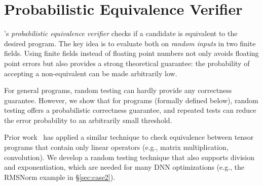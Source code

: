 \section{Probabilistic Equivalence Verifier}
\label{sec:verify}


\sys's {\em probabilistic equivalence verifier} checks if a candidate \graph is equivalent to the desired \lax program.
The key idea is to evaluate both on {\em random inputs} in two finite fields.
Using finite fields instead of floating point numbers not only avoids floating point errors but also provides a strong theoretical guarantee: the probability of accepting a non-equivalent \graph can be made arbitrarily low.

%
For general programs, random testing can hardly provide any correctness guarantee.
%
However, we show that for \lax programs (formally defined below), random testing offers a probabilistic correctness guarantee, and repeated tests can reduce the error probability to an arbitrarily small threshold.

Prior work~\cite{wang2021pet} has applied a similar technique to check equivalence between tensor programs that contain only linear operators (e.g., matrix multiplication, convolution).
We develop a random testing technique that also supports division and exponentiation, which are needed for many DNN optimizations (e.g., the RMSNorm example in \S\ref{sec:case2}).

